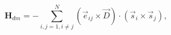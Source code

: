 \documentclass[preview]{standalone}
\begin{document}
\begin{varwidth}{50in}
  \begin{equation}
    \bm{H}_{dm} = -\sum_{{ i,j}=1,i\neq j}^{N} 
    \left( \vec{e}_{ij} \times \vec{D} \right)
    \cdot\left(\vec{s}_{i}\times \vec{s}_{j}\right), 
    \nonumber
  \end{equation}
\end{varwidth}
\end{document}
